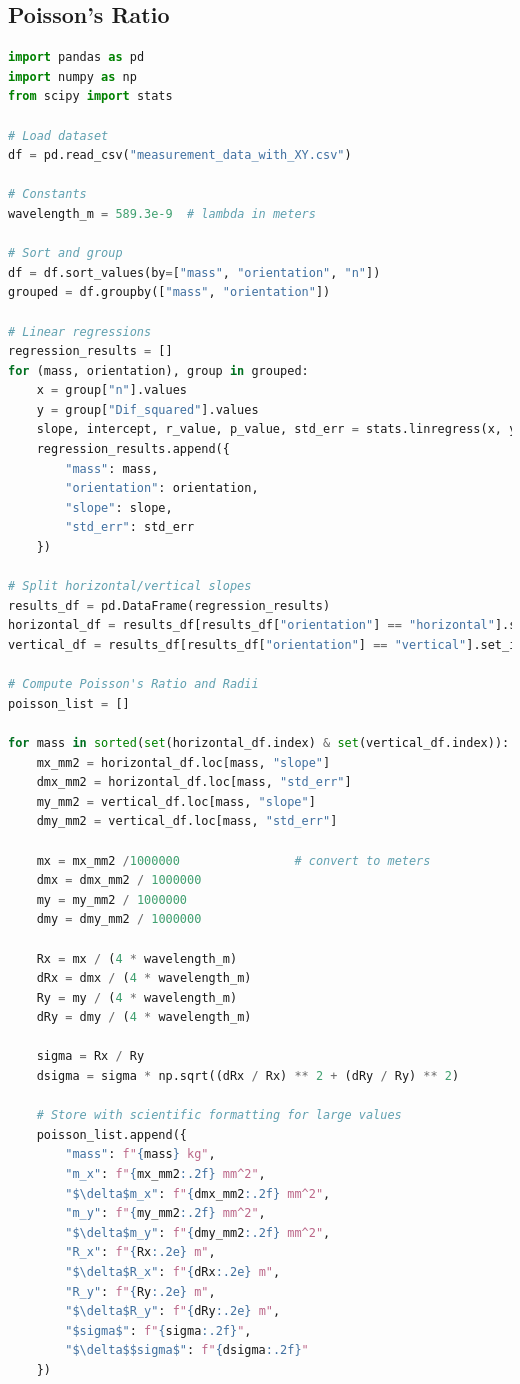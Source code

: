 \documentclass[a4paper,11pt]{article}
\begin{document}
\subsection{Poisson's Ratio}
\begin{lstlisting}[language=Python]
import pandas as pd
import numpy as np
from scipy import stats

# Load dataset
df = pd.read_csv("measurement_data_with_XY.csv")

# Constants
wavelength_m = 589.3e-9  # lambda in meters

# Sort and group
df = df.sort_values(by=["mass", "orientation", "n"])
grouped = df.groupby(["mass", "orientation"])

# Linear regressions
regression_results = []
for (mass, orientation), group in grouped:
    x = group["n"].values
    y = group["Dif_squared"].values
    slope, intercept, r_value, p_value, std_err = stats.linregress(x, y)
    regression_results.append({
        "mass": mass,
        "orientation": orientation,
        "slope": slope,
        "std_err": std_err
    })

# Split horizontal/vertical slopes
results_df = pd.DataFrame(regression_results)
horizontal_df = results_df[results_df["orientation"] == "horizontal"].set_index("mass")
vertical_df = results_df[results_df["orientation"] == "vertical"].set_index("mass")

# Compute Poisson's Ratio and Radii
poisson_list = []

for mass in sorted(set(horizontal_df.index) & set(vertical_df.index)):
    mx_mm2 = horizontal_df.loc[mass, "slope"]
    dmx_mm2 = horizontal_df.loc[mass, "std_err"]
    my_mm2 = vertical_df.loc[mass, "slope"]
    dmy_mm2 = vertical_df.loc[mass, "std_err"]

    mx = mx_mm2 /1000000                # convert to meters
    dmx = dmx_mm2 / 1000000
    my = my_mm2 / 1000000
    dmy = dmy_mm2 / 1000000

    Rx = mx / (4 * wavelength_m)
    dRx = dmx / (4 * wavelength_m)
    Ry = my / (4 * wavelength_m)
    dRy = dmy / (4 * wavelength_m)

    sigma = Rx / Ry
    dsigma = sigma * np.sqrt((dRx / Rx) ** 2 + (dRy / Ry) ** 2)

    # Store with scientific formatting for large values
    poisson_list.append({
        "mass": f"{mass} kg",
        "m_x": f"{mx_mm2:.2f} mm^2",
        "$\delta$m_x": f"{dmx_mm2:.2f} mm^2",
        "m_y": f"{my_mm2:.2f} mm^2",
        "$\delta$m_y": f"{dmy_mm2:.2f} mm^2",
        "R_x": f"{Rx:.2e} m",
        "$\delta$R_x": f"{dRx:.2e} m",
        "R_y": f"{Ry:.2e} m",
        "$\delta$R_y": f"{dRy:.2e} m",
        "$sigma$": f"{sigma:.2f}",
        "$\delta$$sigma$": f"{dsigma:.2f}"
    })


\end{lstlisting}
\end{document}
